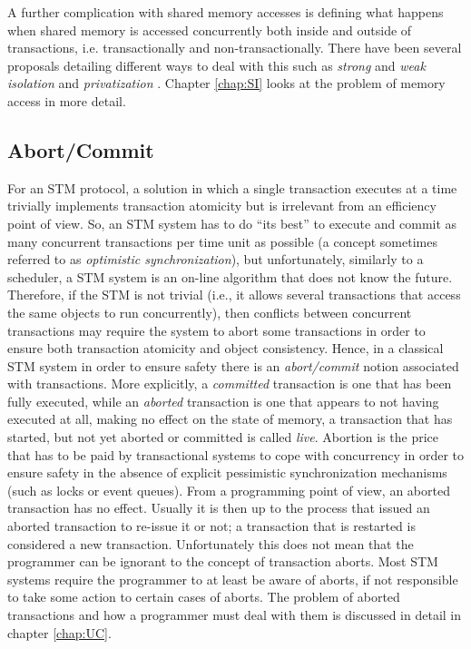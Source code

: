A further complication with shared memory accesses is defining what happens when shared memory is accessed
concurrently both inside and outside
of transactions, i.e. transactionally and non-transactionally.
There have been several proposals detailing different ways to deal with this such as \emph{strong} and \emph{weak isolation} \cite{shpeis07}
and \emph{privatization} \cite{spear:privitization:podc:2007}.
Chapter \ref{chap:SI} looks at the problem of memory access in more detail.

\subsection{Abort/Commit}
For an STM protocol, a solution in which a single transaction  executes at a time
trivially implements transaction atomicity but is irrelevant from 
an efficiency point of view. So, an STM system has to do ``its best'' to 
execute and commit as many concurrent transactions  per time unit as possible
(a concept sometimes referred to as \emph{optimistic synchronization}), 
but unfortunately, similarly to 
a scheduler, a STM system is an on-line algorithm that does not know 
the future. Therefore, if the STM is not trivial (i.e., it allows several transactions 
that access the same objects to run concurrently),  
then conflicts between concurrent transactions may require the system to abort some transactions in order 
to ensure both transaction  atomicity and object consistency.
Hence,  in  a
classical  STM system  in order to ensure safety  there    is  an    {\it   abort/commit}    notion
associated   with transactions.
More explicitly, a \emph{committed} transaction is one that has been fully executed, while
an \emph{aborted} transaction is one that appears to not having executed at all, making no effect
on the state of memory, a transaction that has started, but not yet aborted or committed is called
\emph{live}.
Abortion is   the price that has to  be paid by transactional  systems to cope 
with concurrency in order to ensure safety in the absence of explicit pessimistic synchronization mechanisms
(such as locks or event queues).
From a programming point of view, an aborted transaction has no effect.
Usually it is then up to the process that issued an aborted transaction to re-issue it or not; 
a transaction that is restarted is considered  a new transaction. 
Unfortunately this does not mean that the programmer can be ignorant to the concept of transaction aborts.
Most STM systems require the programmer to at least be aware of aborts, if not responsible to take
some action to certain cases of aborts.
The problem of aborted transactions and how a programmer must deal with them is discussed in detail in chapter
\ref{chap:UC}.



